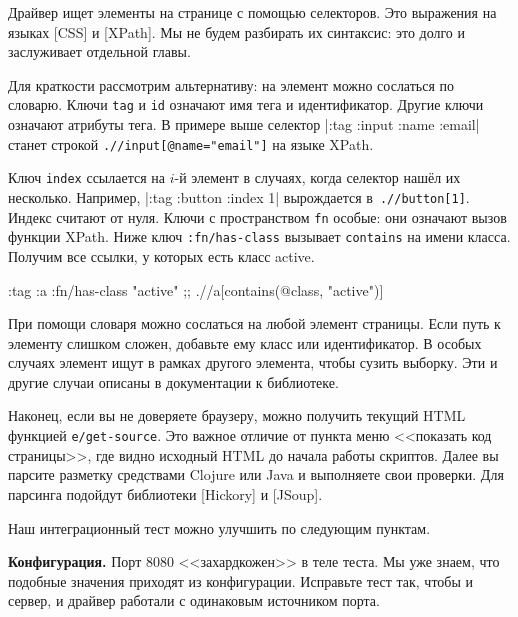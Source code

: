 
Драйвер ищет элементы на странице с помощью селекторов. Это выражения на языках
[CSS] и
[XPath]. Мы
не будем разбирать их синтаксис: это долго и заслуживает отдельной главы.

Для краткости рассмотрим альтернативу: на элемент можно сослаться по
словарю. Ключи \verb|tag| и \verb|id| означают имя тега и идентификатор. Другие
ключи означают атрибуты тега. В примере выше селектор
\spverb|{:tag :input :name :email}| станет строкой
\verb|.//input[@name="email"]| на языке XPath.


Ключ \verb|index| ссылается на $i$-й элемент в случаях, когда селектор нашёл их
несколько. Например, \spverb|{:tag :button :index 1}| вырождается
в~\verb|.//button[1]|. Индекс считают от нуля. Ключи с пространством \verb|fn|
особые: они означают вызов функции XPath. Ниже ключ \verb|:fn/has-class|
вызывает \verb|contains| на имени класса. Получим все ссылки, у которых есть
класс active.

\begin{english}
  \begin{clojure}
{:tag :a :fn/has-class "active"}
;; .//a[contains(@class, "active")]
  \end{clojure}
\end{english}

При помощи словаря можно сослаться на любой элемент страницы. Если путь к
элементу слишком сложен, добавьте ему класс или идентификатор. В особых случаях
элемент ищут в рамках другого элемента, чтобы сузить выборку. Эти и другие
случаи описаны в документации к библиотеке.

Наконец, если вы не доверяете браузеру, можно получить текущий HTML функцией
\verb|e/get-source|. Это важное отличие от пункта меню <<показать код
страницы>>, где видно исходный HTML до начала работы скриптов. Далее вы парсите
разметку средствами Clojure или Java и выполняете свои проверки. Для парсинга
подойдут библиотеки
[Hickory] и
[JSoup].


Наш интеграционный тест можно улучшить по следующим пунктам.

\textbf{Конфигурация.} Порт 8080 <<захардкожен>> в теле теста. Мы уже знаем, что
подобные значения приходят из конфигурации. Исправьте тест так, чтобы и сервер,
и драйвер работали с одинаковым источником порта.

